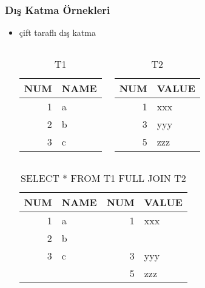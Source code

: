\documentclass[dvipsnames]{beamer}
\theoremstyle{plain}
\begin{document}
\begin{frame}[fragile]
  \frametitle{Dış Katma Örnekleri}

  \begin{itemize}
    \item çift taraflı dış katma
    \begin{columns}[t]
      \begin{tiny}
      \begin{table}
        \caption{T1}
        \begin{tabular}{|r|l|}\hline
NUM & NAME\\\hline\hline
  1 & a   \\\hline
  2 & b   \\\hline
  3 & c   \\\hline
        \end{tabular}
      \end{table}
      \end{tiny}

      \begin{tiny}
      \begin{table}
        \caption{T2}
        \begin{tabular}{|r|l|}\hline
NUM & VALUE\\\hline\hline
  1 & xxx  \\\hline
  3 & yyy  \\\hline
  5 & zzz  \\\hline
        \end{tabular}
      \end{table}
      \end{tiny}
    \end{columns}

    \pause
    \begin{center}
      \begin{tiny}
      \begin{table}
        \caption{SELECT * FROM T1 FULL JOIN T2}
        \begin{tabular}{|r|l|r|l|}\hline
NUM & NAME & NUM & VALUE\\\hline\hline
  1 & a    &   1 & xxx  \\\hline
  2 & b    &     &      \\\hline
  3 & c    &   3 & yyy  \\\hline
    &      &   5 & zzz  \\\hline
        \end{tabular}
      \end{table}
      \end{tiny}
    \end{center}
  \end{itemize}
\end{frame}
\end{document}
